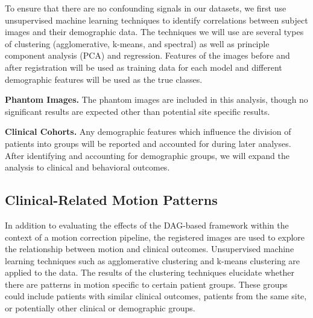 To ensure that there are no confounding signals in our datasets, we first use unsupervised machine learning techniques to identify correlations between subject images and their demographic data. The techniques we will use are several types of clustering (agglomerative, k-means, and spectral) as well as principle component analysis (PCA) and regression. Features of the images before and after registration will be used as training data for each model and different demographic features will be used as the true classes. %

\textbf{Phantom Images.} The phantom images are included in this analysis, though no significant results are expected other than potential site specific results.

\textbf{Clinical Cohorts.} Any demographic features which influence the division of patients into groups will be reported and accounted for during later analyses. After identifying and accounting for demographic groups, we will expand the analysis to clinical and behavioral outcomes.


\subsection{Clinical-Related Motion Patterns} %

In addition to evaluating the effects of the DAG-based framework within the context of a motion correction pipeline, the registered images are used to explore the relationship between motion and clinical outcomes. Unsupervised machine learning techniques such as agglomerative clustering and k-means clustering are applied to the data. The results of the clustering techniques elucidate whether there are patterns in motion specific to certain patient groups. These groups could include patients with similar clinical outcomes, patients from the same site, or potentially other clinical or demographic groups.




